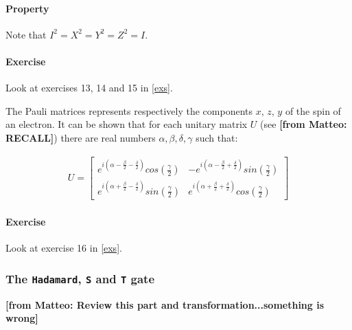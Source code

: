 \documentclass[a4paper,10pt]{article}
\newcommand{\from}[2]{{\bf[{\sc from #1:} #2]}}
\begin{document}
\paragraph{Property} Note that $I^2 = X^2 = Y^2 = Z^2 = I$.

\paragraph{Exercise} Look at exercises 13, 14 and 15 in \autoref{exs}.

The Pauli matrices represents respectively the components $x$, $z$, $y$ of the spin of an electron. It can be shown that for each unitary matrix $U$ (see \from{Matteo}{RECALL}) there are real numbers $\alpha, \beta, \delta, \gamma$ such that:

\begin{equation}
\begin{aligned}
U = \begin{bmatrix}
e^{i(\alpha - \frac{\beta}{2} - \frac{\delta}{2})}cos(\frac{\gamma}{2}) & -e^{i(\alpha - \frac{\beta}{2} + \frac{\delta}{2})}sin(\frac{\gamma}{2}) \\
e^{i(\alpha + \frac{\beta}{2} - \frac{\delta}{2})}sin(\frac{\gamma}{2}) & e^{i(\alpha + \frac{\beta}{2} + \frac{\delta}{2})}cos(\frac{\gamma}{2})
\end{bmatrix}
\end{aligned}
\label{eq:unitaryMatrixTheorem}
\end{equation}

\paragraph{Exercise} Look at exercise 16 in \autoref{exs}.

\subsubsection{The \texttt{Hadamard}, \texttt{S} and \texttt{T} gate}

\from{Matteo}{Review this part and transformation...something is wrong}
\end{document}
